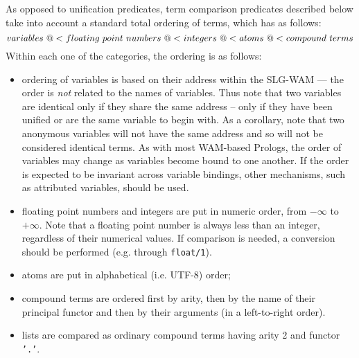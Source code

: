 As opposed to unification predicates, term comparison predicates
described below take into account a standard total ordering of terms,
which has as follows:
%
\[ 
variables \ {\tt @<} \ floating \ point \ numbers \ {\tt @<} \ integers \ {\tt @<} \ atoms \ {\tt @<} \ compound \ terms 
\] 
%
Within each one of the categories, the ordering is as follows:
\begin{itemize}
\item ordering of variables is based on their address within the
  SLG-WAM --- the order is {\em not\/} related to the names of
  variables.  Thus note that two variables are identical only if they
  share the same address -- only if they have been unified or are the
  same variable to begin with.  As a corollary, note that two
  anonymous variables will not have the same address and so will not
  be considered identical terms.  As with most WAM-based Prologs, the
  order of variables may change as variables become bound to one
  another.  If the order is expected to be invariant across variable
  bindings, other mechanisms, such as attributed variables, should be
  used.
\item floating point numbers and integers are put in numeric order,
  from $-\infty$ to $+\infty$.  Note that a floating point number is
  always less than an integer, regardless of their numerical values.
  If comparison is needed, a conversion should be performed
  (e.g. through {\tt float/1}).
\item	atoms are put in alphabetical (i.e. UTF-8) order;
\item	compound terms are ordered first by arity, then by the name of their
	principal functor and then by their arguments (in a left-to-right 
	order).
\item	lists are compared as ordinary compound terms having arity 2 and 
	functor {\tt '.'}.
\end{itemize}

